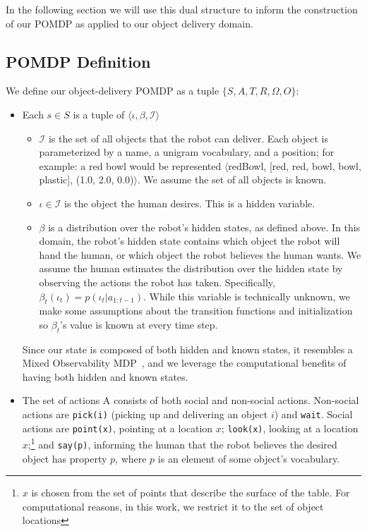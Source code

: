 \documentclass[conference]{IEEEtran}
\newcommand{\Iota}{\mathcal{I}}
\begin{document}
In the following section we will use this dual structure to inform the construction of our POMDP as applied to our object delivery domain. 


\subsection{POMDP Definition}

We define our object-delivery POMDP as a tuple $\{S, A, T, R, \Omega, O\}$: 

\begin{itemize}
	\item Each $s \in S$ is a tuple of $\langle \iota, \beta, \Iota \rangle$		\begin{itemize}
			\item $\Iota$ is the set of all objects that the robot can deliver. Each object is parameterized by a name, a unigram vocabulary, and a position; for example: a red bowl would be represented $\langle$redBowl, [red, red, bowl, bowl, plastic], (1.0, 2.0, 0.0)$\rangle$. We assume the set of all objects is known. 
			\item $\iota \in \Iota$ is the object the human desires. This is a hidden variable. 
			\item $\beta$ is a distribution over the robot's hidden states, as defined above. In this domain, the robot's hidden state contains which object the robot will hand the human, or which object the robot believes the human wants. We assume the human estimates the distribution over the hidden state by observing the actions the robot has taken. Specifically, $\beta_t(\iota_t) = p(\iota_t | a_{1:t-1})$. While this variable is technically unknown, we make some assumptions about the transition functions and initialization so $\beta_t$'s value is known at every time step. 
		\end{itemize}
		Since our state is composed of both hidden and known states, it resembles a Mixed Observability MDP~\citep{momdp}, and we leverage the computational benefits of having both hidden and known states. 
	\item The set of actions A consists of both social and non-social actions. Non-social actions are \texttt{pick(i)} (picking up  and delivering an object $i$) and \texttt{wait}. Social actions are \texttt{point(x)}, pointing at a location $x$; \texttt{look(x)}, looking at a location $x$;\footnote{$x$ is chosen from the set of points that describe the surface of the table. For computational reasons, in this work, we restrict it to the set of object locations} and \texttt{say(p)}, informing the human that the robot believes the desired object has property $p$, where $p$ is an element of some object's vocabulary. 

\end{itemize}
\end{document}
